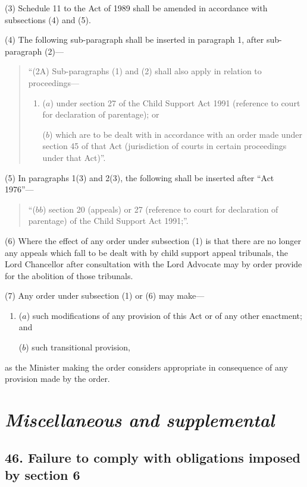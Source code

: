 \documentclass[12pt,a4paper]{article}
\begin{document}
(3) Schedule 11 to the Act of 1989 shall be amended in accordance with subsections (4)  and (5).

(4) The following sub-paragraph shall be inserted in paragraph 1, after sub-paragraph (2)—
\begin{quotation}
“(2A) Sub-paragraphs (1)  and (2)  shall also apply in relation to proceedings—
\begin{enumerate}\item[]
($a$) under section 27 of the Child Support Act 1991 (reference to court for declaration of parentage); or

($b$) which are to be dealt with in accordance with an order made under section 45 of that Act (jurisdiction of courts in certain proceedings under that Act)”.
\end{enumerate}
\end{quotation}

(5) In paragraphs 1(3)  and 2(3), the following shall be inserted after “Act 1976”—
\begin{quotation}
“($bb$) section 20 (appeals) or 27 (reference to court for declaration of parentage) of the Child Support Act 1991;”.
\end{quotation}

(6) Where the effect of any order under subsection (1)  is that there are no longer any appeals which fall to be dealt with by child support appeal tribunals, the Lord Chancellor after consultation with the Lord Advocate may by order provide for the abolition of those tribunals.

(7) Any order under subsection (1)  or (6)  may make—
\begin{enumerate}\item[]
($a$) such modifications of any provision of this Act or of any other enactment; and

($b$) such transitional provision,
\end{enumerate}
as the Minister making the order considers appropriate in consequence of any provision made by the order.


\section{\itshape Miscellaneous and supplemental}

\subsection{46. Failure to comply with obligations imposed by section 6}
\end{document}
